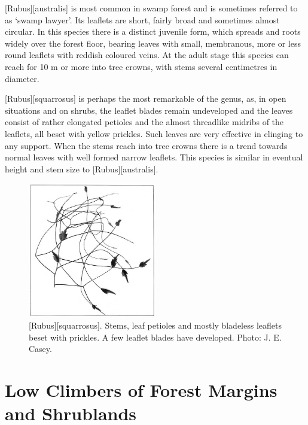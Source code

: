[Rubus][australis] is most common in swamp forest and is sometimes referred to as `swamp lawyer'.
Its leaflets are short, fairly broad and sometimes almost circular.
In this species there is a distinct juvenile form, which spreads and roots widely over the forest floor, bearing leaves with small, membranous, more or less round leaflets with reddish coloured veins.
At the adult stage this species can reach for 10 m or more into tree crowns, with stems several centimetres in diameter.

[Rubus][squarrosus] is perhaps the most remarkable of the genus, as, in open situations and on shrubs, the leaflet blades remain undeveloped and the leaves consist of rather elongated petioles and the almost threadlike midribs of the leaflets, all beset with yellow prickles.
Such leaves are very effective in clinging to any support.
When the stems reach into tree crowns there is a trend towards normal leaves with well formed narrow leaflets.
This species is similar in eventual height and stem size to [Rubus][australis].

\begin{figure}
	\includegraphics[width=0.5\textwidth]{graphics/figure37rubus.jpg}
	\centering
	\caption[\emph{Rubus squarrosus}]{[Rubus][squarrosus].
	Stems, leaf petioles and mostly bladeless leaflets beset with prickles.
	A few leaflet blades have developed.
	Photo: J. E. Casey.}%
	\label{fig:37rubus}
\end{figure}

\section{Low Climbers of Forest Margins and Shrublands}

